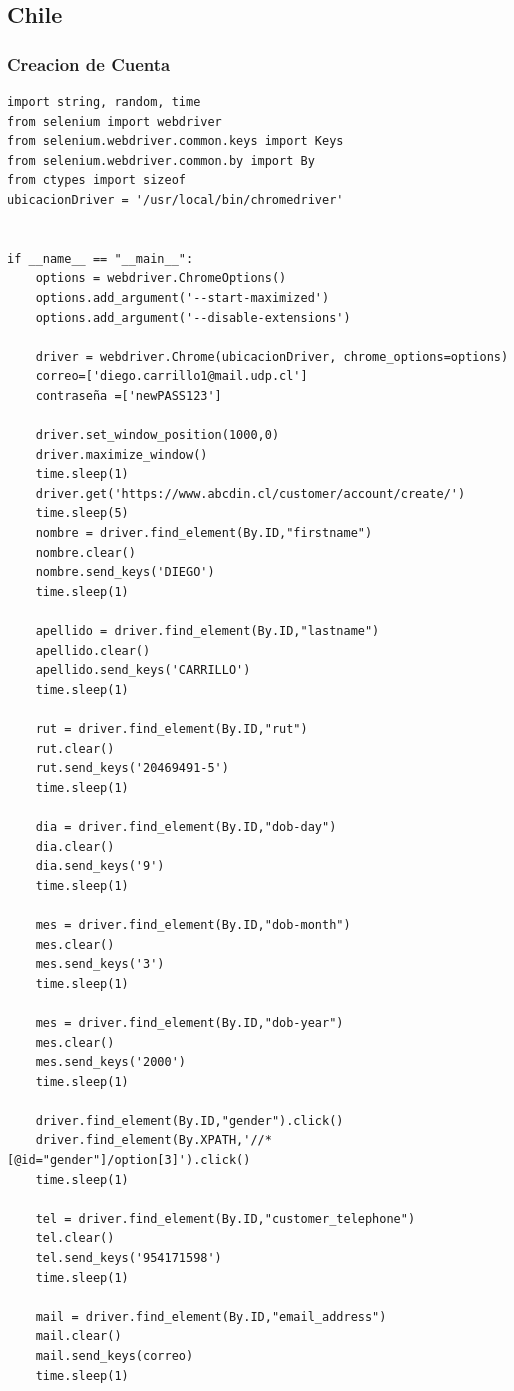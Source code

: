 \documentclass{article}
\begin{document}
\subsection{Chile}
\subsubsection{Creacion de Cuenta}

    \begin{lstlisting}[lenguaje=py]
        import string, random, time
from selenium import webdriver
from selenium.webdriver.common.keys import Keys
from selenium.webdriver.common.by import By
from ctypes import sizeof
ubicacionDriver = '/usr/local/bin/chromedriver'


if __name__ == "__main__":
    options = webdriver.ChromeOptions()
    options.add_argument('--start-maximized')
    options.add_argument('--disable-extensions')

    driver = webdriver.Chrome(ubicacionDriver, chrome_options=options)
    correo=['diego.carrillo1@mail.udp.cl']
    contraseña =['newPASS123']

    driver.set_window_position(1000,0)
    driver.maximize_window()
    time.sleep(1)
    driver.get('https://www.abcdin.cl/customer/account/create/')
    time.sleep(5)
    nombre = driver.find_element(By.ID,"firstname")
    nombre.clear()
    nombre.send_keys('DIEGO')
    time.sleep(1)
    
    apellido = driver.find_element(By.ID,"lastname")
    apellido.clear()
    apellido.send_keys('CARRILLO')
    time.sleep(1)

    rut = driver.find_element(By.ID,"rut")
    rut.clear()
    rut.send_keys('20469491-5')
    time.sleep(1)

    dia = driver.find_element(By.ID,"dob-day")
    dia.clear()
    dia.send_keys('9')
    time.sleep(1)

    mes = driver.find_element(By.ID,"dob-month")
    mes.clear()
    mes.send_keys('3')
    time.sleep(1)

    mes = driver.find_element(By.ID,"dob-year")
    mes.clear()
    mes.send_keys('2000')
    time.sleep(1)

    driver.find_element(By.ID,"gender").click()
    driver.find_element(By.XPATH,'//*[@id="gender"]/option[3]').click()
    time.sleep(1)

    tel = driver.find_element(By.ID,"customer_telephone")
    tel.clear()
    tel.send_keys('954171598')
    time.sleep(1)

    mail = driver.find_element(By.ID,"email_address")
    mail.clear()
    mail.send_keys(correo)
    time.sleep(1)


\end{lstlisting}
\end{document}

